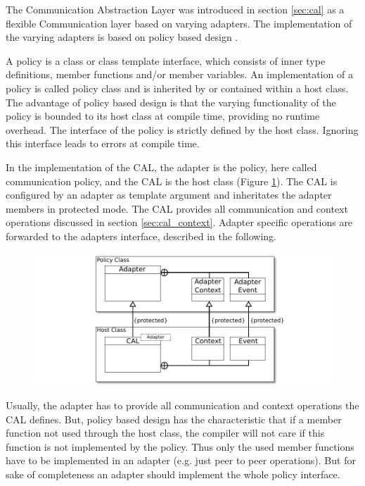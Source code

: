 The Communication Abstraction Layer was introduced in section
\ref{sec:cal} as a flexible Communication layer based on varying
adapters. The implementation of the varying adapters is based on
policy based design \cite{ref:policy_based_design}.

A policy is a class or class template interface, which consists of
inner type definitions, member functions and/or member variables. An
implementation of a policy is called policy class and is inherited by
or contained within a host class.  The advantage of policy based
design is that the varying functionality of the policy is bounded to
its host class at compile time, providing no runtime overhead.  The
interface of the policy is strictly defined by the host
class. Ignoring this interface leads to errors at compile time.

In the implementation of the CAL, the adapter is the policy, here
called communication policy, and the CAL is the host class (Figure
\ref{fig:cal_uml}). The CAL is configured by an adapter as template
argument and inheritates the adapter members in protected mode. The
CAL provides all communication and context operations discussed in
section \ref{sec:cal_context}. Adapter specific operations are
forwarded to the adapters interface, described in the following.


\begin{figure}[H]
  \centering \includegraphics[width=\textwidth]{graphics/40_cal_uml}
  \caption{ }
  \label{fig:cal_uml}
\end{figure}

Usually, the adapter has to provide all communication and context
operations the CAL defines. But, policy based design has the
characteristic that if a member function not used through the host
class, the compiler will not care if this function is not implemented
by the policy.  Thus only the used member functions have to be
implemented in an adapter (e.g. just peer to peer operations). But for
sake of completeness an adapter should implement the whole policy
interface.

